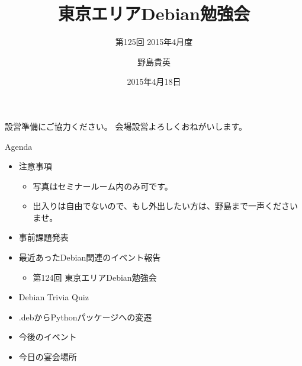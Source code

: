 \title{東京エリアDebian勉強会}
\subtitle{第125回 2015年4月度}
\author{野島貴英}
\date{2015年4月18日}



\begin{frame}
\titlepage{}
\end{frame}

\begin{frame}{設営準備にご協力ください。}
会場設営よろしくおねがいします。
\end{frame}

\begin{frame}{Agenda}
 \begin{minipage}[t]{0.45\hsize}
  \begin{itemize}
   \item 注意事項
	 \begin{itemize}
	  \item 写真はセミナールーム内のみ可です。
          \item 出入りは自由でないので、もし外出したい方は、野島まで一声くださいませ。
	 \end{itemize}
   \item 事前課題発表
  \end{itemize}
 \end{minipage} 
 \begin{minipage}[t]{0.45\hsize}
  \begin{itemize}
   \item 最近あったDebian関連のイベント報告
	 \begin{itemize}
	 \item 第124回 東京エリアDebian勉強会
	 \end{itemize}
   \item Debian Trivia Quiz
   \item .debからPythonパッケージへの変遷
   \item 今後のイベント
   \item 今日の宴会場所
  \end{itemize}
 \end{minipage}
\end{frame}

